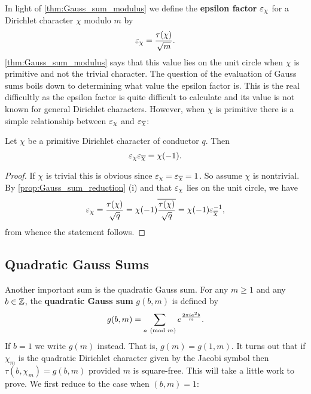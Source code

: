       In light of \cref{thm:Gauss_sum_modulus} we define the \textbf{epsilon factor} $\varepsilon_{\chi}$ for a Dirichlet character $\chi$ modulo $m$ by
      \[
        \varepsilon_{\chi} = \frac{\tau(\chi)}{\sqrt{m}}.
      \]
      \cref{thm:Gauss_sum_modulus} says that this value lies on the unit circle when $\chi$ is primitive and not the trivial character. The question of the evaluation of Gauss sums boils down to determining what value the epsilon factor is. This is the real difficultly as the epsilon factor is quite difficult to calculate and its value is not known for general Dirichlet characters. However, when $\chi$ is primitive there is a simple relationship between $\varepsilon_{\chi}$ and $\varepsilon_{\overline{\chi}}$:

      \begin{proposition}\label{prop:epsilon_factor_relationship}
        Let $\chi$ be a primitive Dirichlet character of conductor $q$. Then
        \[
          \varepsilon_{\chi}\varepsilon_{\overline{\chi}} = \chi(-1).
        \]
      \end{proposition}
      \begin{proof}
        If $\chi$ is trivial this is obvious since $\varepsilon_{\chi} = \varepsilon_{\overline{\chi}} = 1$. So assume $\chi$ is nontrivial. By \cref{prop:Gauss_sum_reduction} (i) and that $\varepsilon_{\chi}$ lies on the unit circle, we have
        \[
          \varepsilon_{\chi} = \frac{\tau(\chi)}{\sqrt{q}} = \chi(-1)\overline{\frac{\tau(\chi)}{\sqrt{q}}} = \chi(-1)\varepsilon_{\overline{\chi}}^{-1},
        \]
        from whence the statement follows.
      \end{proof}
    \subsection*{Quadratic Gauss Sums}
      Another important sum is the quadratic Gauss sum. For any $m \ge 1$ and any $b \in \mathbb{Z}$, the \textbf{quadratic Gauss sum} $g(b,m)$ is defined by
      \[
        g(b,m) = \sum_{a \ (\mathrm{mod}\text{ }m)}e^{\frac{2\pi ia^{2}b}{m}}.
      \]
      If $b = 1$ we write $g(m)$ instead. That is, $g(m) = g(1,m)$. It turns out that if $\chi_{m}$ is the quadratic Dirichlet character given by the Jacobi symbol then $\tau(b,\chi_{m}) = g(b,m)$ provided $m$ is square-free. This will take a little work to prove. We first reduce to the case when $(b,m) = 1$:

